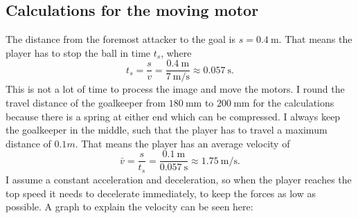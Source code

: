 \subsection{Calculations for the moving motor}\label{subsec:moving_motor}
The distance from the foremost attacker to the goal is $s=\qty[per-mode=symbol]{0.4}{\m}$.
That means the player has to stop the ball in time $t_s$, where
\begin{equation}
    \label{eq:stopping_time}
    t_s = \frac{s}{v} = \frac{\qty[per-mode=symbol]{0.4}{\m}}{\qty[per-mode=symbol]{7}{\m\per\s}} \approx \qty[per-mode=symbol]{0.057}{\s}.
\end{equation}
This is not a lot of time to process the image and move the motors.
I round the travel distance of the goalkeeper from $\qty[per-mode=symbol]{180}{\mm}$ to $\qty[per-mode=symbol]{200}{\mm}$ for the calculations because there is a spring at either end which can be compressed.
I always keep the goalkeeper in the middle, such that the player has to travel a maximum distance of $0.1m$.
That means the player has an average velocity of
\begin{equation}
    \label{eq:average_velocity}
    \bar{v} = \frac{s}{t_s} = \frac{\qty[per-mode=symbol]{0.1}{\m}}{\qty[per-mode=symbol]{0.057}{\s}} \approx \qty[per-mode=symbol]{1.75}{\m\per\s}.
\end{equation}
I assume a constant acceleration and deceleration, so when the player reaches the top speed it needs to decelerate immediately, to keep the forces as low as possible.
A graph to explain the velocity can be seen here:

\begin{center}
\end{center}


